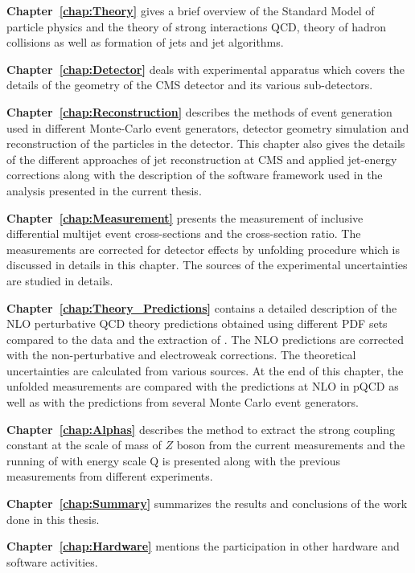 {\bf Chapter~\ref{chap:Theory}} gives a brief overview of the Standard Model of particle physics and the theory of strong interactions QCD, theory of hadron collisions as well as formation of jets and jet algorithms. 

{\bf Chapter~\ref{chap:Detector}} deals with experimental apparatus which covers the details of the geometry of the CMS detector and its various sub-detectors.

{\bf Chapter~\ref{chap:Reconstruction}} describes the methods of event generation used in different Monte-Carlo event generators, detector geometry simulation and reconstruction of the particles in the detector. This chapter also gives the details of the different approaches of jet reconstruction at CMS and applied jet-energy corrections along with the description of the software framework used in the analysis presented in the current thesis.

{\bf Chapter~\ref{chap:Measurement}} presents the measurement of inclusive differential multijet event cross-sections and the cross-section ratio. The measurements are corrected for detector effects by unfolding procedure which is discussed in details in this chapter. The sources of the experimental uncertainties are studied in details. 

{\bf Chapter~\ref{chap:Theory_Predictions}} contains a detailed description of the NLO perturbative QCD theory predictions obtained using different PDF sets compared to the data and the extraction of \alps. The NLO predictions are corrected with the non-perturbative and electroweak corrections. The theoretical uncertainties are calculated from various sources. At the end of this chapter, the unfolded measurements are compared with the predictions at NLO in pQCD as well as with the predictions from several Monte Carlo event generators.

{\bf Chapter~\ref{chap:Alphas}} describes the method to extract the strong coupling constant at the scale of mass of $Z$ boson \alpsmz from the current measurements and the running of \alps with energy scale Q is presented along with the previous measurements from different experiments.

{\bf Chapter~\ref{chap:Summary}} summarizes the results and conclusions of the work done in this thesis.

{\bf Chapter~\ref{chap:Hardware}} mentions the participation in other hardware and software activities.
